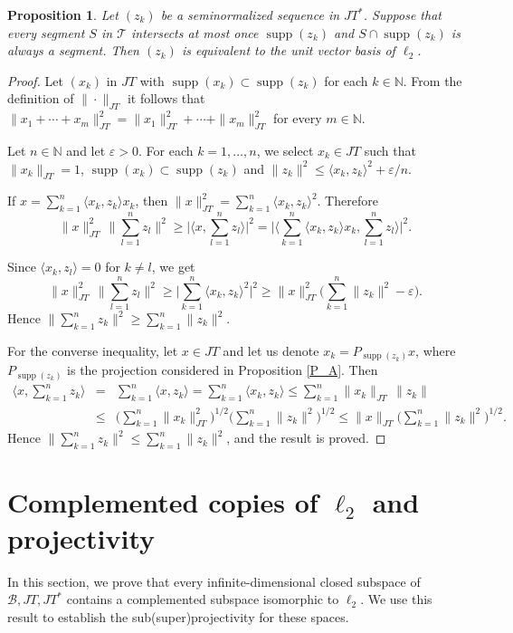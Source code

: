 \documentclass[12pt]{amsart}
\theoremstyle{plain}
\numberwithin{equation}{section}
\newcommand{\N}{\mathbb{N}}
\newcommand{\e}{\varepsilon}
\newcommand{\Tree}{\mathcal{T}}
\DeclareMathOperator{\supp}{supp}
\newtheorem{proposition}[theorem]{Proposition}
\begin{document}
\begin{proposition}\label{F-G}
Let $(z_k)$ be a seminormalized sequence in $JT^*$.
Suppose that every segment $S$ in $\Tree$ intersects at most once $\supp(z_k)$ and $S\cap \supp(z_k)$ is always a segment. Then $(z_k)$ is equivalent to the unit vector basis of $\ell_2$.
\end{proposition}
\begin{proof}
Let $(x_k)$ in $JT$ with $\supp(x_k)\subset \supp(z_k)$ for each $k\in\N$. From the definition of $\|\cdot\|_{JT}$ it follows that $\|x_1+\cdots+x_m\|_{JT}^2= \|x_1\|_{JT}^2+ \cdots+\|x_m\|_{JT}^2$ for every $m\in\N$.

Let $n\in\N$ and let $\e>0$.
For each $k=1,\ldots,n$, we select $x_k\in JT$ such that $\|x_k\|_{JT}=1$, $\supp(x_k) \subset \supp(z_k)$ and $\|z_k\|^2\leq \langle x_k, z_k\rangle^2 +\e/n$.

If $x=\sum_{k=1}^n \langle x_k, z_k\rangle x_k$, then $\|x\|_{JT}^2= \sum_{k=1}^n \langle x_k, z_k\rangle^2$. Therefore
$$
\|x\|_{JT}^2\, \Big\|\sum_{l=1}^n z_l\Big\|^2 \geq  \Big|\Big\langle x, \sum_{l=1}^n z_l\Big\rangle\Big|^2 = \Big|\Big\langle \sum_{k=1}^n \langle x_k, z_k\rangle x_k, \sum_{l=1}^n z_l\Big\rangle\Big|^2.
$$

Since $\langle x_k,z_l\rangle=0$ for $k\neq l$, we get
$$
\|x\|_{JT}^2\, \Big\|\sum_{l=1}^n z_l\Big\|^2 \geq
\Big| \sum_{k=1}^n \langle x_k, z_k\rangle^2\Big|^2 \geq \|x\|_{JT}^2 \Big(\sum_{k=1}^n \|z_k\|^2-\e\Big).
$$
Hence $\|\sum_{k=1}^n z_k\|^2 \geq \sum_{k=1}^n \|z_k\|^2$.
\medskip

For the converse inequality, let $x\in JT$ and let us denote $x_k= P_{\supp(z_k)}x$, where $P_{\supp(z_k)}$ is the projection considered in Proposition \ref{P_A}. Then
\begin{eqnarray*}
\Big\langle x,\sum_{k=1}^n z_k\Big\rangle &=& \sum_{k=1}^n\langle x, z_k\rangle =
\sum_{k=1}^n\langle x_k, z_k\rangle \leq
\sum_{k=1}^n\|x_k\|_{JT}\, \|z_k\| \\
&\leq& \Big(\sum_{k=1}^n\|x_k\|_{JT}^2\Big)^{1/2} \Big(\sum_{k=1}^n\|z_k\|^2\Big)^{1/2}\leq \|x\|_{JT} \Big(\sum_{k=1}^n\|z_k\|^2\Big)^{1/2}.
\end{eqnarray*}
Hence $\|\sum_{k=1}^n z_k\|^2 \leq \sum_{k=1}^n \|z_k\|^2$, and the result is proved.
\end{proof}



\section{Complemented copies of $\ell_2$ and projectivity}\label{sect:l2}
In this section, we prove that every infinite-dimensional closed subspace of $\mathcal{B}, JT, JT^*$ contains a complemented subspace isomorphic to $\ell_2$. We use this result to establish the sub(super)projectivity for these spaces.
\end{document}
